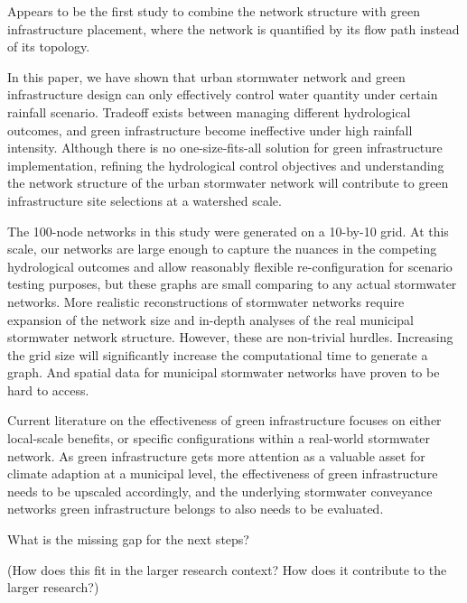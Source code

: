 \documentclass[draft]{agujournal2019}
\begin{document}
Appears to be the first study to combine the network structure with green infrastructure placement, where the network is quantified by its flow path instead of its topology. 

In this paper, we have shown that urban stormwater network and green infrastructure design can only effectively control water quantity under certain rainfall scenario. Tradeoff exists between managing different hydrological outcomes, and green infrastructure become ineffective under high rainfall intensity. Although there is no one-size-fits-all solution for green infrastructure implementation, refining the hydrological control objectives and understanding the network structure of the urban stormwater network will contribute to green infrastructure site selections at a watershed scale. 

The 100-node networks in this study were generated on a 10-by-10 grid. At this scale, our networks are large enough to capture the nuances in the competing hydrological outcomes and allow reasonably flexible re-configuration for scenario testing purposes, but these graphs are small comparing to any actual stormwater networks. More realistic reconstructions of stormwater networks require expansion of the network size and in-depth analyses of the real municipal stormwater network structure. However, these are non-trivial hurdles. Increasing the grid size will significantly increase the computational time to generate a graph. And spatial data for municipal stormwater networks have proven to be hard to access. 

Current literature on the effectiveness of green infrastructure focuses on either local-scale benefits, or specific configurations within a real-world stormwater network. As green infrastructure gets more attention as a valuable asset for climate adaption at a municipal level, the effectiveness of green infrastructure needs to be upscaled accordingly, and the underlying stormwater conveyance networks green infrastructure belongs to also needs to be evaluated. 

What is the missing gap for the next steps? 

(How does this fit in the larger research context? How does it contribute to the larger research?)




\end{document}
